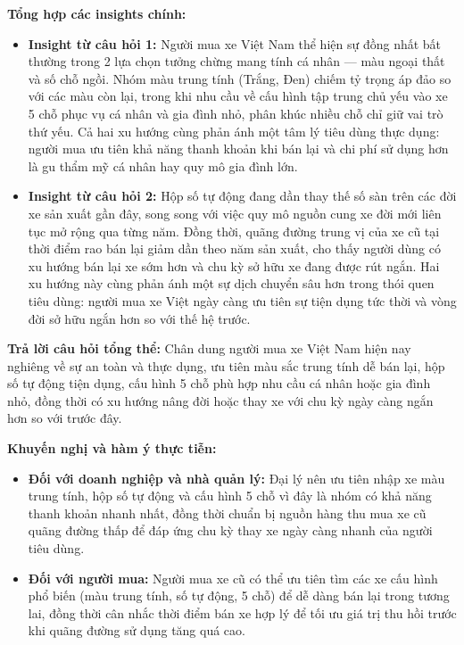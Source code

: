\noindent\textbf{Tổng hợp các insights chính:}
\begin{itemize}
    \item \textbf{Insight từ câu hỏi 1:} Người mua xe Việt Nam thể hiện sự đồng nhất bất thường trong 2 lựa chọn tưởng chừng mang tính cá nhân — màu ngoại thất và số chỗ ngồi. Nhóm màu trung tính (Trắng, Đen) chiếm tỷ trọng áp đảo so với các màu còn lại, trong khi nhu cầu về cấu hình tập trung chủ yếu vào xe 5 chỗ phục vụ cá nhân và gia đình nhỏ, phân khúc nhiều chỗ chỉ giữ vai trò thứ yếu. Cả hai xu hướng cùng phản ánh một tâm lý tiêu dùng thực dụng: người mua ưu tiên khả năng thanh khoản khi bán lại và chi phí sử dụng hơn là gu thẩm mỹ cá nhân hay quy mô gia đình lớn.
    \item \textbf{Insight từ câu hỏi 2:} Hộp số tự động đang dần thay thế số sàn trên các đời xe sản xuất gần đây, song song với việc quy mô nguồn cung xe đời mới liên tục mở rộng qua từng năm. Đồng thời, quãng đường trung vị của xe cũ tại thời điểm rao bán lại giảm dần theo năm sản xuất, cho thấy người dùng có xu hướng bán lại xe sớm hơn và chu kỳ sở hữu xe đang được rút ngắn. Hai xu hướng này cùng phản ánh một sự dịch chuyển sâu hơn trong thói quen tiêu dùng: người mua xe Việt ngày càng ưu tiên sự tiện dụng tức thời và vòng đời sở hữu ngắn hơn so với thế hệ trước.
\end{itemize}

\noindent\textbf{Trả lời câu hỏi tổng thể:} Chân dung người mua xe Việt Nam hiện nay nghiêng về sự an toàn và thực dụng, ưu tiên màu sắc trung tính dễ bán lại, hộp số tự động tiện dụng, cấu hình 5 chỗ phù hợp nhu cầu cá nhân hoặc gia đình nhỏ, đồng thời có xu hướng nâng đời hoặc thay xe với chu kỳ ngày càng ngắn hơn so với trước đây.

\noindent\textbf{Khuyến nghị và hàm ý thực tiễn:}
\begin{itemize}
    \item \textbf{Đối với doanh nghiệp và nhà quản lý:} Đại lý nên ưu tiên nhập xe màu trung tính, hộp số tự động và cấu hình 5 chỗ vì đây là nhóm có khả năng thanh khoản nhanh nhất, đồng thời chuẩn bị nguồn hàng thu mua xe cũ quãng đường thấp để đáp ứng chu kỳ thay xe ngày càng nhanh của người tiêu dùng.
    \item \textbf{Đối với người mua:} Người mua xe cũ có thể ưu tiên tìm các xe cấu hình phổ biến (màu trung tính, số tự động, 5 chỗ) để dễ dàng bán lại trong tương lai, đồng thời cân nhắc thời điểm bán xe hợp lý để tối ưu giá trị thu hồi trước khi quãng đường sử dụng tăng quá cao.
\end{itemize}

